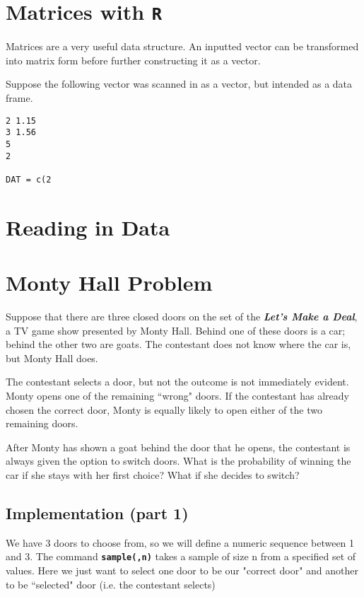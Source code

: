 \newpage
\section{Matrices with \texttt{R}}

Matrices are a very useful data structure. 
An inputted vector can be transformed into matrix form before further constructing it as a vector.

Suppose the following vector was scanned in as a vector, but intended as a data frame.
\begin{framed}
\begin{verbatim}
2 1.15 
3 1.56
5
2

DAT = c(2
\end{verbatim}
\end{framed}
\section{Reading in Data}





\section{Monty Hall Problem}
Suppose that there are three closed doors on the set of the  \textbf{\emph{Let's Make a Deal}}, a TV game show presented by Monty Hall. Behind one of these doors is a car; behind the other two are goats. The contestant does not know where the car is, but Monty Hall does.

The contestant selects a door, but not the outcome is not immediately evident. Monty opens one of the remaining ``wrong" doors. If the contestant has already chosen the correct door, Monty is equally likely to open either of the two remaining doors.

After Monty has shown a goat behind the door that he opens, the contestant is always given the option to switch doors. What is the probability of winning the car if she stays with her first choice? What if she decides to switch?



\subsection{Implementation (part 1)}
We have 3 doors to choose from, so we will define a numeric sequence between 1 and 3. The command \texttt{\textbf{sample(,n)}} takes a sample of size n from a specified set of values. Here we just want to select one door to be our "correct door" and another to be ``selected" door (i.e. the contestant selects)

